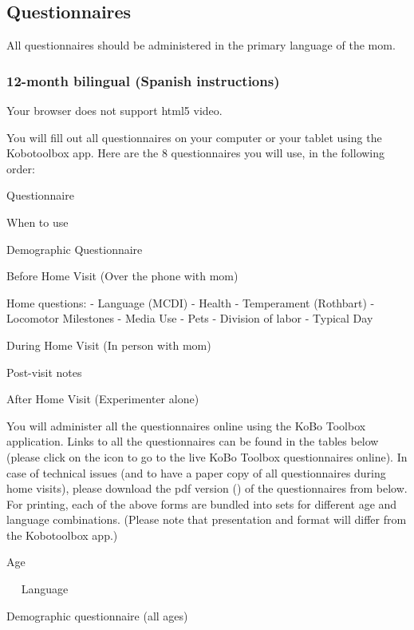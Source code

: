 \documentclass[
  12pt,
]{book}
\begin{document}
\hypertarget{questionnaires-1}{%
\subsection{Questionnaires}\label{questionnaires-1}}

All questionnaires should be administered in the primary language of the mom.

\hypertarget{month-bilingual-spanish-instructions}{%
\subsubsection*{12-month bilingual (Spanish instructions)}\label{month-bilingual-spanish-instructions}}

Your browser does not support html5 video.

You will fill out all questionnaires on your computer or your tablet using the Kobotoolbox app. Here are the 8 questionnaires you will use, in the following order:

Questionnaire

{When to use}

Demographic Questionnaire

{Before Home Visit (Over the phone with mom)}

Home questions:
- Language (MCDI)
- Health
- Temperament (Rothbart)
- Locomotor Milestones
- Media Use
- Pets
- Division of labor
- Typical Day

{During Home Visit (In person with mom)}

Post-visit notes

{ After Home Visit (Experimenter alone)}

You will administer all the questionnaires online using the KoBo Toolbox application. Links to all the questionnaires can be found in the tables below (please click on the icon to go to the live KoBo Toolbox questionnaires online). In case of technical issues (and to have a paper copy of all questionnaires during home visits), please download the pdf version () of the questionnaires from below. For printing, each of the above forms are bundled into sets for different age and language combinations. (Please note that presentation and format will differ from the Kobotoolbox app.)

Age

  Language

Demographic questionnaire (all ages)
\end{document}
